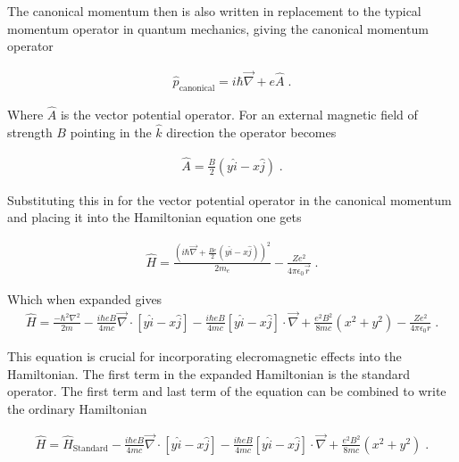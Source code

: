         The canonical momentum then is also written in replacement to the typical momentum operator in quantum mechanics, giving the canonical momentum operator 

        \begin{align}
            \hat{p}_{\text{canonical}} = i \hbar \vec{\nabla} + e \hat{A} \;.
        \end{align}

        \noindent Where $\hat{A}$ is the vector potential operator. For an external magnetic field of strength $B$ pointing in the $\hat{k}$ direction the operator becomes 

        \begin{align}
            \hat{A} = \frac{B}{2} \left(y \hat{i} - x \hat{j} \right)\;.
        \end{align}

        \noindent Substituting this in for the vector potential operator in the canonical momentum and placing it into the Hamiltonian equation one gets 

        \begin{align}
            \hat{H} = \frac{\left(i\hbar \vec{\nabla} + \frac{Be}{2}\left(y \hat{i} - x \hat{j} \right)\right)^2}{2m_e} - \frac{Ze^2}{4 \pi \epsilon_0 \vec{r}}\;.
        \end{align}

        \noindent Which when expanded gives
        \small
        \begin{align}
            \hat{H} = \frac{-\hbar^2 \nabla^2}{2m} - \frac{i\hbar e B}{4mc} \vec{\nabla} \cdot \left[y\hat{i} - x\hat{j} \right] - \frac{i\hbar e B}{4mc} \left[y\hat{i} - x\hat{j} \right] \cdot \vec{\nabla} + \frac{e^2B^2}{8mc} \left(x^2 + y^2\right) - \frac{Ze^2}{4\pi \epsilon_0 r}\;.
        \end{align}
        \normalsize

        \noindent This equation is crucial for incorporating elecromagnetic effects into the Hamiltonian. The first term in the expanded Hamiltonian is the standard operator. The first term and last term of the equation can be combined to write the ordinary Hamiltonian 

        \begin{align}
            \hat{H} =  \hat{H}_{\text{Standard}} - \frac{i\hbar e B}{4mc} \vec{\nabla} \cdot \left[y\hat{i} - x\hat{j} \right] - \frac{i\hbar e B}{4mc} \left[y\hat{i} - x\hat{j} \right] \cdot \vec{\nabla} + \frac{e^2B^2}{8mc} \left(x^2 + y^2\right)\;.
        \end{align}

